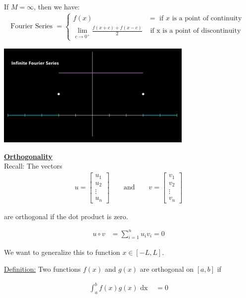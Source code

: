 \documentclass{article}
\newcommand{\topic}[1]{\textbf{\underline{#1}}}
\newcommand{\dx}{\text{ dx }}
\newcommand{\dfn}{\underline{Definition:} }
\begin{document}
  If $M = \infty$, then we have:
  \begin{align}
    \text{Fourier Series } =
    \begin{cases}
      f(x) & = \text{ if $x$ is a point of continuity }\\
      \lim_{c \to 0^+} \frac{f(x + c) + f(x - c)}{2} & \text{ if x is a point of discontinuity}
    \end{cases}
  \end{align}

  \begin{center}
    \includegraphics[height=5cm]{Fourier Infinite Fourier Series}
  \end{center}

  \topic{Orthogonality}\\
  Recall: The vectors
  \begin{align}
    u =
    \begin{bmatrix}
      u_1\\
      u_2\\
      \vdots\\
      u_n
    \end{bmatrix}
    \qquad \text{and} \qquad
    v =
    \begin{bmatrix}
      v_1\\
      v_2\\
      \vdots\\
      v_n
    \end{bmatrix}
  \end{align}

  are orthogonal if the dot product is zero.

  \begin{align}
    u \circ v & = \sum^n_{i = 1} u_i v_i = 0
  \end{align}

  We want to generalize this to function $x \in [-L, L]$.

  \dfn Two functions $f(x)$ and $g(x)$ are orthogonal on $[a, b]$ if

  \begin{align}
    \int^b_a f(x)g(x) \dx & = 0
  \end{align}
\end{document}

